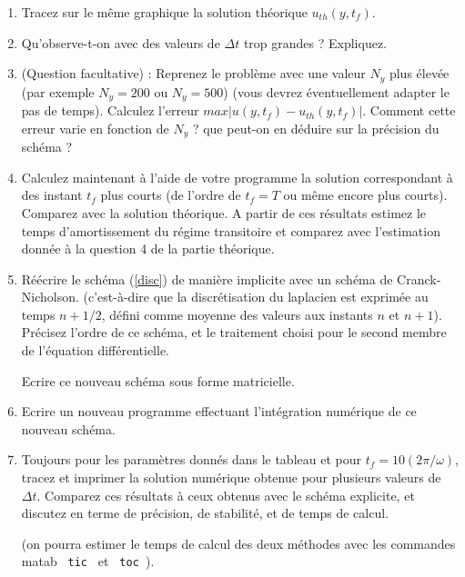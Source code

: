 \documentclass[a4,12pt]{article}
\begin{document}
\begin{enumerate}
\item Tracez sur le même graphique la solution théorique $u_{th}(y,t_f)$.

\item Qu'observe-t-on avec des valeurs de $\Delta t$ trop grandes ? Expliquez.

\item (Question facultative) : Reprenez le problème avec une valeur $N_y$ plus élevée (par exemple $N_y=200$ ou $N_y=500$) (vous devrez éventuellement adapter le pas de temps). Calculez  l'erreur $max | u(y,t_f) - u_{th}(y,t_f)|$. Comment cette erreur varie en fonction de $N_y$ ? que peut-on en déduire sur la précision du schéma ?

\item Calculez maintenant à l'aide de votre programme la solution 
correspondant à des instant $t_f$ plus courts (de l'ordre de  $t_f = T$ ou même encore plus courts).
Comparez avec la solution théorique. A partir de ces résultats estimez le temps d'amortissement du régime transitoire et comparez avec 
l'estimation donnée à la question 4 de la partie théorique.




\item R\'e\'ecrire le sch\'ema (\ref{disc}) de mani\`ere implicite avec un schéma de Cranck-Nicholson.
(c'est-\`a-dire que la discr\'etisation du laplacien est exprim\'ee au temps $n+1/2$, défini comme 
moyenne des valeurs aux instants $n$ et $n+1$). Précisez l'ordre de ce schéma, et le traitement 
choisi pour le second membre de l'équation différentielle.


Ecrire ce nouveau schéma sous forme matricielle. 

\item Ecrire un nouveau programme effectuant l'intégration numérique de ce nouveau schéma.

\item Toujours pour les paramètres donnés dans le tableau et pour $t_f = 10 (2\pi/\omega)$, tracez et imprimer la solution numérique obtenue pour plusieurs valeurs de $\Delta t$. Comparez ces résultats à ceux obtenus avec le schéma explicite, et discutez en terme de précision, de stabilité, 
et de temps de calcul.

(on pourra estimer le temps de calcul des deux méthodes avec les commandes matab \verb| tic | et \verb| toc |).





\end{enumerate}
\end{document}

